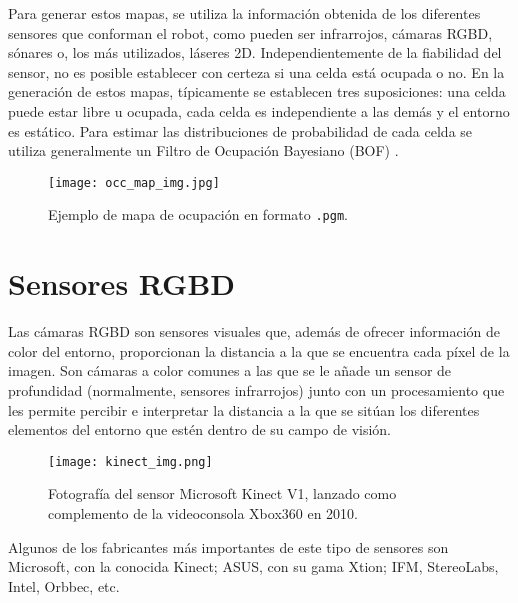 Para generar estos mapas, se utiliza la información obtenida de los diferentes sensores que conforman el robot, como pueden ser infrarrojos, cámaras RGBD, sónares o, los más utilizados, láseres 2D. Independientemente de la fiabilidad del sensor, no es posible establecer con certeza si una celda está ocupada o no. En la generación de estos mapas, típicamente se establecen tres suposiciones: una celda puede estar libre u ocupada, cada celda es independiente a las demás y el entorno es estático. Para estimar las distribuciones de probabilidad de cada celda se utiliza generalmente un Filtro de Ocupación Bayesiano (BOF) \cite{occupancy_grid}.\\

\begin{figure}[h]
\begin{center} \label{fig:occ_map}
\texttt{[image: occ\_map\_img.jpg]}
\end{center}
\caption{Ejemplo de mapa de ocupación en formato \texttt{.pgm}.}
\end{figure}

\section{Sensores RGBD}

Las cámaras RGBD son sensores visuales que, además de ofrecer información de color del entorno, proporcionan la distancia a la que se encuentra cada píxel de la imagen. Son cámaras a color comunes a las que se le añade un sensor de profundidad (normalmente, sensores infrarrojos) junto con un procesamiento que les permite percibir e interpretar la distancia a la que se sitúan los diferentes elementos del entorno que estén dentro de su campo de visión.\\

\begin{figure}[h]
	\begin{center} 
		\texttt{[image: kinect\_img.png]}
	\end{center}
	\caption{Fotografía del sensor Microsoft Kinect V1, lanzado como complemento de la videoconsola Xbox360 en 2010. \cite{kinectv1}}
	\label{fig:kinect}
\end{figure}

Algunos de los fabricantes más importantes de este tipo de sensores son Microsoft, con la conocida Kinect; ASUS, con su gama Xtion; IFM, StereoLabs, Intel, Orbbec, etc.\\

